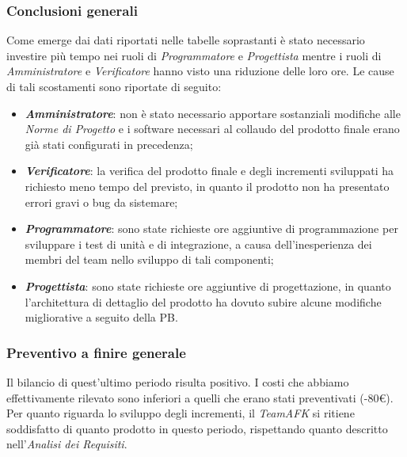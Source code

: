 \subsubsection{Conclusioni generali}
Come emerge dai dati riportati nelle tabelle soprastanti è stato necessario investire più tempo nei ruoli di \textit{Programmatore} e \textit{Progettista} mentre i ruoli di \textit{Amministratore} e \textit{Verificatore} hanno visto una riduzione delle loro ore. Le cause di tali scostamenti sono riportate di seguito:
\begin{itemize}
	\item \textbf{\textit{Amministratore}}: non è stato necessario apportare sostanziali modifiche alle \textit{Norme di Progetto} e i software necessari al collaudo del prodotto finale erano già stati configurati in precedenza;
	\item \textbf{\textit{Verificatore}}: la verifica del prodotto finale e degli incrementi sviluppati ha richiesto meno tempo del previsto, in quanto il prodotto non ha presentato errori gravi o bug da sistemare;
	\item \textbf{\textit{Programmatore}}: sono state richieste ore aggiuntive di programmazione per sviluppare i test di unità e di integrazione, a causa dell'inesperienza dei membri del team nello sviluppo di tali componenti;
	\item \textbf{\textit{Progettista}}: sono state richieste ore aggiuntive di progettazione, in quanto l'architettura di dettaglio del prodotto ha dovuto subire alcune modifiche migliorative a seguito della PB.
\end{itemize}


\subsubsection{Preventivo a finire generale}
Il bilancio di quest'ultimo periodo risulta positivo. I costi che abbiamo effettivamente rilevato sono inferiori a quelli che erano stati preventivati (-80€).
Per quanto riguarda lo sviluppo degli incrementi, il \textit{TeamAFK} si ritiene soddisfatto di quanto prodotto in questo periodo, rispettando quanto descritto nell'\textit{Analisi dei Requisiti}.


